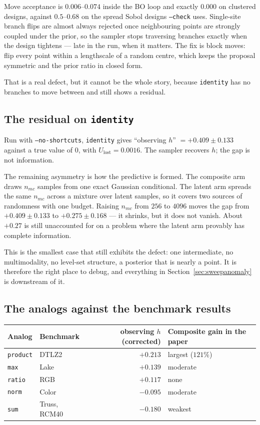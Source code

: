 \documentclass[11pt]{article}
\newcommand{\Ulost}{U_{\text{lost}}}
\begin{document}
Move acceptance is $0.006$--$0.074$ inside the BO loop and exactly $0.000$ on
clustered designs, against $0.5$--$0.68$ on the spread Sobol designs
\texttt{--check} uses. Single-site branch flips are almost always rejected once
neighbouring points are strongly coupled under the prior, so the sampler stops
traversing branches exactly when the design tightens --- late in the run, when it
matters. The fix is block moves: flip every point within a lengthscale of a
random centre, which keeps the proposal symmetric and the prior ratio in closed
form.

That is a real defect, but it cannot be the whole story, because
\texttt{identity} has no branches to move between and still shows a residual.

\subsection{The residual on \texttt{identity}}
\label{sec:residual}

Run with \texttt{--no-shortcuts}, \texttt{identity} gives
``observing $h$'' $=+0.409\pm0.133$ against a true value of $0$, with
$\Ulost=0.0016$. The sampler recovers $h$; the gap is not information.

The remaining asymmetry is how the predictive is formed. The composite arm draws
$n_{mc}$ samples from one exact Gaussian conditional. The latent arm spreads the
same $n_{mc}$ across a mixture over latent samples, so it covers two sources of
randomness with one budget. Raising $n_{mc}$ from $256$ to $4096$ moves the gap
from $+0.409\pm0.133$ to $+0.275\pm0.168$ --- it shrinks, but it does not vanish.
About $+0.27$ is still unaccounted for on a problem where the latent arm
provably has complete information.

This is the smallest case that still exhibits the defect: one intermediate, no
multimodality, no level-set structure, a posterior that is nearly a point. It is
therefore the right place to debug, and everything in
Section~\ref{sec:sweepanomaly} is downstream of it.

\subsection{The analogs against the benchmark results}

\begin{center}
\begin{tabular}{llrl}
\toprule
Analog & Benchmark & observing $h$ (corrected) & Composite gain in the paper \\
\midrule
\texttt{product} & DTLZ2        & $+0.213$ & largest ($121\%$) \\
\texttt{max}     & Lake         & $+0.139$ & moderate \\
\texttt{ratio}   & RGB          & $+0.117$ & none \\
\texttt{norm}    & Color        & $-0.095$ & moderate \\
\texttt{sum}     & Truss, RCM40 & $-0.180$ & weakest \\
\bottomrule
\end{tabular}
\end{center}
\end{document}
